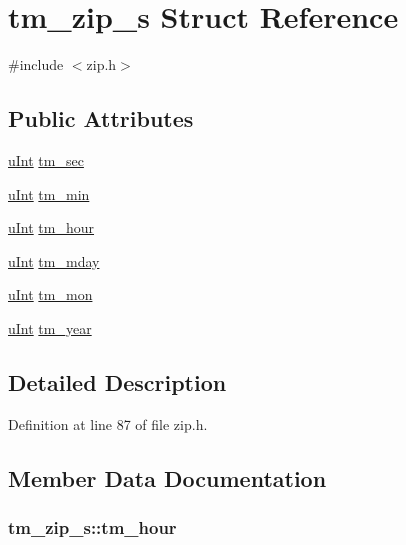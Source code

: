 \hypertarget{structtm__zip__s}{\section{tm\-\_\-zip\-\_\-s Struct Reference}
\label{structtm__zip__s}
}


{\ttfamily \#include $<$zip.\-h$>$}

\subsection*{Public Attributes}
\begin{DoxyCompactItemize}
\item 
\hyperlink{zconf_8h_a87d141052bcd5ec8a80812a565c70369}{u\-Int} \hyperlink{structtm__zip__s_adf073cb37484b209d7f7f0e23275a52d}{tm\-\_\-sec}
\item 
\hyperlink{zconf_8h_a87d141052bcd5ec8a80812a565c70369}{u\-Int} \hyperlink{structtm__zip__s_ad539676c1522e9f2cb77cb9e65795e2a}{tm\-\_\-min}
\item 
\hyperlink{zconf_8h_a87d141052bcd5ec8a80812a565c70369}{u\-Int} \hyperlink{structtm__zip__s_abfde1cc7378be65b4b23e1488e9bd279}{tm\-\_\-hour}
\item 
\hyperlink{zconf_8h_a87d141052bcd5ec8a80812a565c70369}{u\-Int} \hyperlink{structtm__zip__s_aebc461dd0a4a7b7ebd4e00de5fbf594d}{tm\-\_\-mday}
\item 
\hyperlink{zconf_8h_a87d141052bcd5ec8a80812a565c70369}{u\-Int} \hyperlink{structtm__zip__s_ae98d11f7e2b2330b3a83efe97ffef574}{tm\-\_\-mon}
\item 
\hyperlink{zconf_8h_a87d141052bcd5ec8a80812a565c70369}{u\-Int} \hyperlink{structtm__zip__s_ad58d60c6a536a0861dec11c6ef270753}{tm\-\_\-year}
\end{DoxyCompactItemize}


\subsection{Detailed Description}


Definition at line 87 of file zip.\-h.



\subsection{Member Data Documentation}
\hypertarget{structtm__zip__s_abfde1cc7378be65b4b23e1488e9bd279}{
\subsubsection[{tm\-\_\-hour}]{ tm\-\_\-zip\-\_\-s\-::tm\-\_\-hour}}\label{structtm__zip__s_abfde1cc7378be65b4b23e1488e9bd279}


